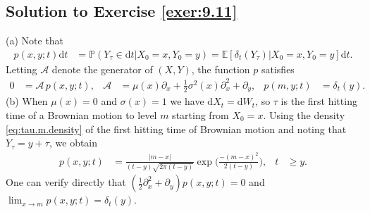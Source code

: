 \documentclass[12pt]{book}
\numberwithin{equation}{chapter}
\theoremstyle{plain}
\numberwithin{theorem}{section}
\theoremstyle{definition}
\numberwithin{exercise}{chapter}
\newcommand{\<}{\langle}
\renewcommand{\>}{\rangle}
\renewcommand{\(}{\left(}
\renewcommand{\)}{\right)}
\renewcommand{\[}{\left[}
\renewcommand{\]}{\right]}
\newcommand\Eb{\mathds{E}}
\newcommand\Pb{\mathds{P}}
\newcommand\Ac{\mathscr{A}}
\newcommand\sig{\sigma}
\newcommand\del{\delta}
\renewcommand\d{\partial}
\newcommand\dd{\mathrm{d}}
\begin{document}
\subsection*{Solution to Exercise \ref{exer:9.11}}
(a) Note that
\begin{align}
p(x,y;t) \dd t
	&= 	\Pb( Y_\tau \in \dd t | X_0 = x, Y_0 = y ) 
	=	\Eb[ \del_t(Y_\tau) | X_0 = x , Y_0 = y ] \dd t.
\end{align}
Letting $\Ac$ denote the generator of $(X,Y)$, the function $p$ satisfies
\begin{align}
0
	&=	\Ac \, p(x,y;t) , &
\Ac
	&=	\mu(x) \d_x + \tfrac{1}{2} \sig^2(x) \d_x^2 + \d_y , &
p(m,y;t)
	&=	\del_t(y) .
\end{align}
(b) When $\mu(x) = 0$ and $\sig(x) = 1$ we have $\dd X_t = \dd W_t$, so $\tau$ is the first hitting time of a Brownian motion to level $m$ starting from $X_0 = x$.  Using the density \eqref{eq:tau.m.density} of the first hitting time of Brownian motion and noting that $Y_\tau = y + \tau$, we obtain
\begin{align}
p(x,y;t)
	&=	\frac{|m-x|}{(t-y)\sqrt{2 \pi (t-y)}} \exp \Big( \frac{ - (m - x)^2 }{2(t - y)} \Big) , &
t
	&\geq y .
\end{align}
One can verify directly that $(\tfrac{1}{2} \d_x^2 + \d_y) p(x,y;t) = 0$ and $\lim_{x \to m} p(x,y;t) = \del_t(y)$.
\end{document}
